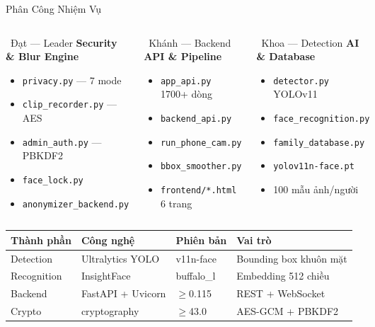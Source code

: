 \documentclass[aspectratio=169, 11pt]{beamer}
\newcommand{\filecode}[1]{\texttt{\textcolor{primary!80!black}{\small #1}}}
\begin{document}
\begin{frame}{Phân Công Nhiệm Vụ}
\begin{columns}[T]
\begin{block}{\textcolor{accent}{\faUserTie\ Đạt — Leader}}
\footnotesize\textbf{Security \& Blur Engine}
\begin{itemize}
  \item \filecode{privacy.py} --- 7 mode
  \item \filecode{clip\_recorder.py} --- AES
  \item \filecode{admin\_auth.py} --- PBKDF2
  \item \filecode{face\_lock.py}
  \item \filecode{anonymizer\_backend.py}
\end{itemize}
\end{block}
\begin{block}{\faUser\ Khánh — Backend}
\footnotesize\textbf{API \& Pipeline}
\begin{itemize}
  \item \filecode{app\_api.py} 1700+ dòng
  \item \filecode{backend\_api.py}
  \item \filecode{run\_phone\_cam.py}
  \item \filecode{bbox\_smoother.py}
  \item \filecode{frontend/*.html} 6 trang
\end{itemize}
\end{block}
\begin{block}{\faUser\ Khoa — Detection}
\footnotesize\textbf{AI \& Database}
\begin{itemize}
  \item \filecode{detector.py} YOLOv11
  \item \filecode{face\_recognition.py}
  \item \filecode{family\_database.py}
  \item \filecode{yolov11n-face.pt}
  \item 100 mẫu ảnh/người
\end{itemize}
\end{block}
\end{columns}

\vspace{0.3em}
\begin{center}\footnotesize
\begin{tabular}{llll}
\toprule
\textbf{Thành phần} & \textbf{Công nghệ} & \textbf{Phiên bản} & \textbf{Vai trò} \\
\midrule
Detection & Ultralytics YOLO & v11n-face & Bounding box khuôn mặt \\
Recognition & InsightFace & buffalo\_l & Embedding 512 chiều \\
Backend & FastAPI + Uvicorn & $\geq$0.115 & REST + WebSocket \\
Crypto & cryptography & $\geq$43.0 & AES-GCM + PBKDF2 \\
\bottomrule
\end{tabular}
\end{center}
\end{frame}
\end{document}
